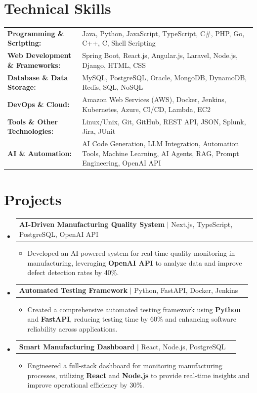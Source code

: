 \documentclass[letterpaper,10pt]{article}
\makeatletter
\newcommand{\resumeItem}[1]{
  \item{\fontsize{8pt}{9pt}\selectfont
    #1 \vspace{-3pt}
  }
}
\newcommand{\resumeProjectHeading}[2]{
    \item
    \begin{tabular*}{1.001\textwidth}{l@{\extracolsep{\fill}}r}
      \fontsize{8.5pt}{10pt}#1 & \textbf{\fontsize{8.5pt}{10pt} #2}\\
    \end{tabular*}\vspace{-7pt}
}
\newcommand{\resumeSubHeadingListStart}{\begin{itemize}[leftmargin=0pt, label={}]}
\newcommand{\resumeSubHeadingListEnd}{\end{itemize}}
\newcommand{\resumeItemListStart}{\begin{itemize}[leftmargin=*]}
\newcommand{\resumeItemListEnd}{\end{itemize}\vspace{-5pt}}
\makeatother
\begin{document}
\section{Technical Skills}
        \vspace{-14pt}
        \begin{table}[h]
            \fontsize{8pt}{9pt}\selectfont
            \begin{tabular}{p{0.3\linewidth} p{0.7\linewidth}}
                \textbf{Programming \& Scripting:} & Java, Python, JavaScript, TypeScript, C\#, PHP, Go, C++, C, Shell Scripting \\
                \textbf{Web Development \& Frameworks:} & Spring Boot, React.js, Angular.js, Laravel, Node.js, Django, HTML, CSS \\
                \textbf{Database \& Data Storage:} & MySQL, PostgreSQL, Oracle, MongoDB, DynamoDB, Redis, SQL, NoSQL \\
                \textbf{DevOps \& Cloud:} & Amazon Web Services (AWS), Docker, Jenkins, Kubernetes, Azure, CI/CD, Lambda, EC2 \\
                \textbf{Tools \& Other Technologies:} & Linux/Unix, Git, GitHub, REST API, JSON, Splunk, Jira, JUnit \\
                \textbf{AI \& Automation:} & AI Code Generation, LLM Integration, Automation Tools, Machine Learning, AI Agents, RAG, Prompt Engineering, OpenAI API \\
            \end{tabular}
        \end{table}
 \vspace{-18pt}

\section{Projects}
    \vspace{-5pt}
    \resumeSubHeadingListStart
          \resumeProjectHeading
            {\textbf{AI-Driven Manufacturing Quality System} $|$ Next.js, TypeScript, PostgreSQL, OpenAI API}{}
            \resumeItemListStart
                \resumeItem{Developed an AI-powered system for real-time quality monitoring in manufacturing, leveraging \textbf{OpenAI API} to analyze data and improve defect detection rates by 40\%.}
            \resumeItemListEnd
        \vspace{-12pt}
    
        \resumeProjectHeading
            {\textbf{Automated Testing Framework} $|$ Python, FastAPI, Docker, Jenkins}{}
        \resumeItemListStart
                \resumeItem{Created a comprehensive automated testing framework using \textbf{Python} and \textbf{FastAPI}, reducing testing time by 60\% and enhancing software reliability across applications.}
        \resumeItemListEnd
      \vspace{-12pt}
      \resumeProjectHeading
        {\textbf{Smart Manufacturing Dashboard} $|$ React, Node.js, PostgreSQL}{}
    \resumeItemListStart
            \resumeItem{Engineered a full-stack dashboard for monitoring manufacturing processes, utilizing \textbf{React} and \textbf{Node.js} to provide real-time insights and improve operational efficiency by 30\%.}
    \resumeItemListEnd
    \resumeSubHeadingListEnd
\end{document}
